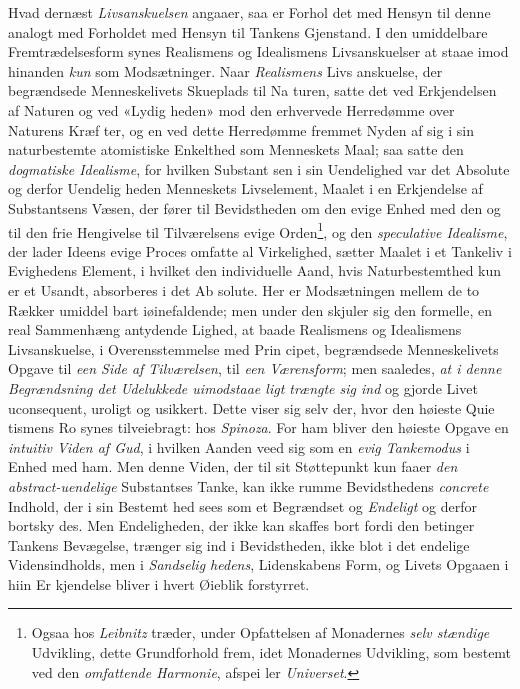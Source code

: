 Hvad dernæst \emph{Livsanskuelsen} angaaer, saa er Forhol\-%
det med Hensyn til denne analogt med Forholdet med Hensyn
til Tankens Gjenstand. I den umiddelbare Fremtrædelsesform
synes Realismens og Idealismens Livsanskuelser at staae imod
hinanden \emph{kun} som Modsætninger. Naar \emph{Realismens} Livs\-%
anskuelse, der begrændsede Menneskelivets Skueplads til Na\-%
turen, satte det ved Erkjendelsen af Naturen og ved «Lydig\-%
heden» mod den erhvervede Herredømme over Naturens Kræf\-%
ter, og en ved dette Herredømme fremmet Nyden af sig i sin
naturbestemte atomistiske Enkelthed som Menneskets Maal;
saa satte den \emph{dogmatiske Idealisme}, for hvilken Substant\-%
sen i sin Uendelighed var det Absolute og derfor Uendelig\-%
heden Menneskets Livselement, Maalet i en Erkjendelse af
Substantsens Væsen, der fører til Bevidstheden om den evige
Enhed med den og til den frie Hengivelse til Tilværelsens
evige Orden\footnote{Ogsaa hos \emph{Leibnitz} træder, under Opfattelsen af Monadernes \emph{selv\-%
stændige} Udvikling, dette Grundforhold frem, idet Monadernes
Udvikling, som bestemt ved den \emph{omfattende Harmonie}, afspei\-%
ler \emph{Universet}.}, og den \emph{speculative Idealisme}, der lader
Ideens evige Proces omfatte al Virkelighed, sætter Maalet i et
Tankeliv i Evighedens Element, i hvilket den individuelle Aand,
 \setcounter{footnote}{0}
hvis Naturbestemthed kun er et Usandt, absorberes i det Ab\-%
solute. Her er Modsætningen mellem de to Rækker umiddel\-%
bart iøinefaldende; men under den skjuler sig den formelle,
en real Sammenhæng antydende Lighed, at baade Realismens
og Idealismens Livsanskuelse, i Overensstemmelse med Prin\-%
cipet, begrændsede Menneskelivets Opgave til \emph{een Side af
Tilværelsen}, til \emph{een Værensform}; men saaledes, \emph{at i
denne Begrændsning det Udelukkede uimodstaae\-%
ligt trængte sig ind} og gjorde Livet uconsequent, uroligt
og usikkert. Dette viser sig selv der, hvor den høieste Quie\-%
tismens Ro synes tilveiebragt: hos \emph{Spinoza}. For ham bliver
den høieste Opgave en \emph{intuitiv Viden af Gud}, i hvilken
Aanden veed sig som en \emph{evig Tankemodus} i Enhed med
ham. Men denne Viden, der til sit Støttepunkt kun faaer
\emph{den abstract-uendelige} Substantses Tanke, kan ikke
rumme Bevidsthedens \emph{concrete} Indhold, der i sin Bestemt\-%
hed sees som et Begrændset og \emph{Endeligt} og derfor bortsky\-%
des. Men Endeligheden, der ikke kan skaffes bort fordi den
betinger Tankens Bevægelse, trænger sig ind i Bevidstheden,
ikke blot i det endelige Vidensindholds, men i \emph{Sandselig\-%
hedens}, Lidenskabens Form, og Livets Opgaaen i hiin Er\-%
kjendelse bliver i hvert Øieblik forstyrret.

